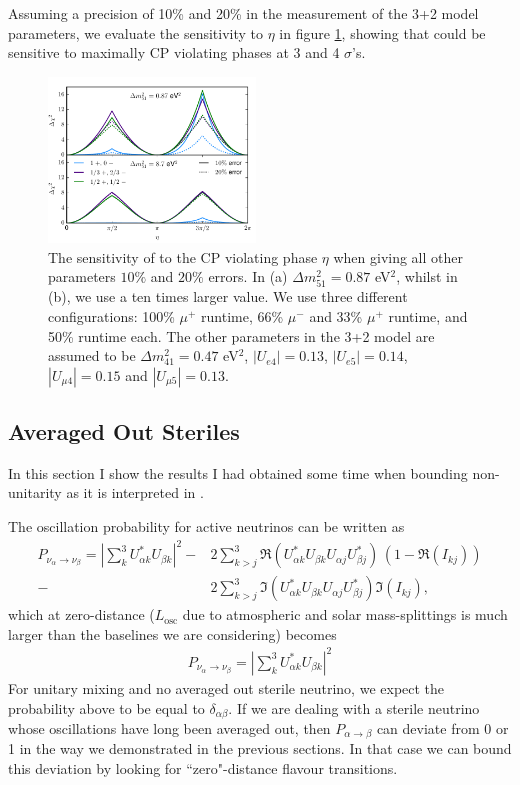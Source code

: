 	Assuming a precision of 10\% and 20\% in the measurement of the 3+2 model parameters, we evaluate the sensitivity to $\eta$ in figure \ref{fig:CP1D}, showing that \nus could be sensitive to maximally CP violating phases at 3 and 4 $\sigma$'s.  


\begin{figure}[t!]
\includegraphics[width=0.49\textwidth]{figs/CP_sensitivity.pdf}
\caption{The sensitivity of \nus to the CP violating phase $\eta$ when giving all other parameters $10 \%$ and $20 \%$ errors. In (a) $\Delta m^2_{51} = 0.87 $ eV$^2$, whilst in (b), we use a ten times larger value. We use three different configurations: 100\% $\mu^+$  runtime, 66\% $\mu^-$ and 33\% $\mu^+$ runtime, and 50\% runtime each. The other parameters in the 3+2 model are assumed to be $\Delta m^2_{41} = 0.47 $ eV$^2$, $|U_{e4}|=0.13$, $|U_{e5}|=0.14$, $|U_{\mu4}|=0.15$ and $|U_{\mu5}|=0.13$. \label{fig:CP1D}}
\end{figure}


\subsection{Averaged Out Steriles}

In this section I show the results I had obtained some time when bounding non-unitarity as it is interpreted in \cite{Ross-Lonergan2016}. 

The oscillation probability for active neutrinos can be written as
\begin{align} \label{eq:general_prob}
P_{\nu_{\alpha} \to \nu_{\beta}}= \left| \sum_k^3 U_{\alpha k}^* U_{\beta k} \right|^2 - & 2 \sum_{k>j}^{3} \Re(U_{\alpha k}^* U_{\beta k} U_{\alpha j} U_{\beta j}^*)\, (1 - \Re(I_{k j})) \\\nonumber -& 2\sum_{k>j}^{3} \Im(U_{\alpha k}^* U_{\beta k} U_{\alpha j} U_{\beta j}^*) \Im(I_{k j}),
\end{align}
which at zero-distance ($L_{\text{osc}}$ due to atmospheric and solar mass-splittings is much larger than the baselines we are considering) becomes
\begin{align} \label{eq:general_prob}
P_{\nu_{\alpha} \to \nu_{\beta}}= \left| \sum_k^3 U_{\alpha k}^* U_{\beta k} \right|^2
\end{align}
For unitary mixing and no averaged out sterile neutrino, we expect the probability above to be equal to $\delta_{\alpha \beta}$. If we are dealing with a sterile neutrino whose oscillations have long been averaged out, then $P_{\alpha \to \beta}$ can deviate from 0 or 1 in the way we demonstrated in the previous sections. In that case we can bound this deviation by looking for ``zero"-distance flavour transitions. 

